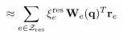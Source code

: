 \documentclass[preview]{standalone}
\begin{document}
\begin{align*}
\special{dvisvgm:raw <g id='unique000'>}\approx\sum_{e\in\mathcal Z_{\rm res}}\xi_e^{\rm res}\,\mathbf W_e(\mathbf q)^T\mathbf r_e\special{dvisvgm:raw </g>}
\end{align*}
\end{document}
